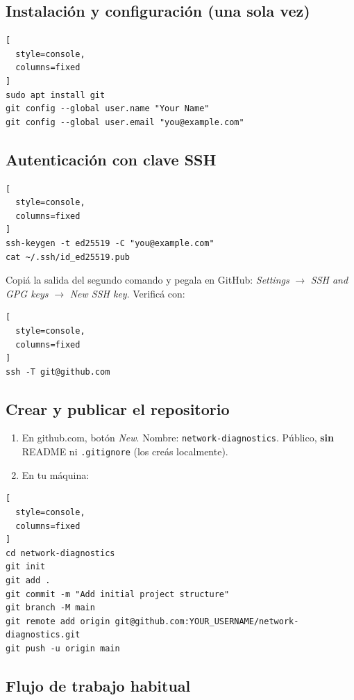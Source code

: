 \documentclass[11pt,a4paper]{article}
\theoremstyle{definition}
\theoremstyle{remark}
\begin{document}
\subsection{Instalación y configuración (una sola vez)}

\begin{lstlisting}[
  style=console,
  columns=fixed
]
sudo apt install git
git config --global user.name "Your Name"
git config --global user.email "you@example.com"
\end{lstlisting}

\subsection{Autenticación con clave SSH}

\begin{lstlisting}[
  style=console,
  columns=fixed
]
ssh-keygen -t ed25519 -C "you@example.com"
cat ~/.ssh/id_ed25519.pub
\end{lstlisting}

Copiá la salida del segundo comando y pegala en GitHub: \emph{Settings} $\to$ \emph{SSH and GPG keys} $\to$ \emph{New SSH key}. Verificá con:

\begin{lstlisting}[
  style=console,
  columns=fixed
]
ssh -T git@github.com
\end{lstlisting}

\subsection{Crear y publicar el repositorio}

\begin{enumerate}
  \item En github.com, botón \emph{New}. Nombre: \texttt{network-diagnostics}. Público, \textbf{sin} README ni \texttt{.gitignore} (los creás localmente).
  \item En tu máquina:
\end{enumerate}

\begin{lstlisting}[
  style=console,
  columns=fixed
]
cd network-diagnostics
git init
git add .
git commit -m "Add initial project structure"
git branch -M main
git remote add origin git@github.com:YOUR_USERNAME/network-diagnostics.git
git push -u origin main
\end{lstlisting}

\subsection{Flujo de trabajo habitual}
\end{document}

